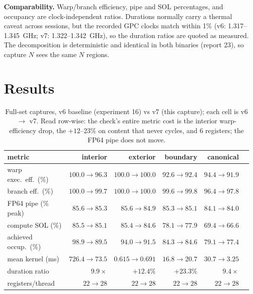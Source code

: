 \documentclass[
	english,
	letterpaper, oneside
]{article}
\begin{document}
\textbf{Comparability.} Warp/branch efficiency, pipe and SOL percentages,
and occupancy are clock-independent ratios. Durations normally carry a
thermal caveat across sessions, but the recorded GPC clocks match within
1\% (v6: 1.317--1.345~GHz; v7: 1.322--1.342~GHz), so the duration ratios
are quoted as measured. The decomposition is deterministic and identical
in both binaries (report 23), so capture $N$ sees the same $N$ regions.

\section{Results}
\label{sec:results}

\begin{table}[H]
\centering
\caption{Full-set captures, v6 baseline (experiment 16) vs v7 (this
capture); each cell is v6 $\to$ v7. Read row-wise: the check's entire
metric cost is the interior warp-efficiency drop, the $+12$--23\% on
content that never cycles, and 6 registers; the FP64 pipe does not move.}
\label{tab:summary}
\footnotesize
\setlength{\tabcolsep}{4pt}
\begin{tabular}{lrrrrr}
\toprule
metric & interior & exterior & boundary & canonical \\
\midrule
warp exec.\ eff.\ (\%) & $100.0 \to 96.3$ & $100.0 \to 100.0$ & $92.6 \to 92.4$ & $94.4 \to 91.9$ \\
branch eff.\ (\%)      & $100.0 \to 99.7$ & $100.0 \to 100.0$ & $99.6 \to 99.8$ & $96.4 \to 97.8$ \\
FP64 pipe (\% peak)    & $85.6 \to 85.3$ & $85.6 \to 84.9$ & $85.3 \to 85.1$ & $84.1 \to 84.0$ \\
compute SOL (\%)       & $85.5 \to 85.1$ & $85.4 \to 84.6$ & $78.1 \to 77.9$ & $69.4 \to 66.6$ \\
achieved occup.\ (\%)  & $98.9 \to 89.5$ & $94.0 \to 91.5$ & $84.3 \to 84.6$ & $79.1 \to 77.4$ \\
mean kernel (ms)       & $726.4 \to 73.5$ & $0.615 \to 0.691$ & $16.8 \to 20.7$ & $30.7 \to 3.25$ \\
duration ratio         & $9.9\times$ & $+12.4\%$ & $+23.3\%$ & $9.4\times$ \\
registers/thread       & $22 \to 28$ & $22 \to 28$ & $22 \to 28$ & $22 \to 28$ \\
\bottomrule
\end{tabular}
\end{table}
\end{document}
